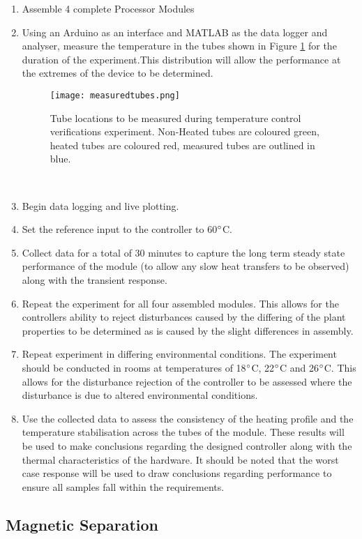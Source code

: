 \begin{enumerate}
	\item Assemble 4 complete Processor Modules
	\item Using an Arduino as an interface and MATLAB as the data logger and analyser, measure the temperature in the tubes shown in Figure \ref{fig:measuredtubes} for the duration of the experiment.This distribution will allow the performance at the extremes of the device to be determined.
	\begin{figure}[!htb]
		\centering
		\texttt{[image: measuredtubes.png]}
		\caption[Temperature Measured Tubes.]{Tube locations to be measured during temperature control verifications experiment. Non-Heated tubes are coloured green, heated tubes are coloured red, measured tubes are outlined in blue.}
		\label{fig:measuredtubes}
	\end{figure} 
	\FloatBarrier
	\item Begin data logging and live plotting.
	\item Set the reference input to the controller to 60$\degree$C.
	\item Collect data for a total of 30 minutes to capture the long term steady state performance of the module (to allow any slow heat transfers to be observed) along with the transient response.
	\item Repeat the experiment for all four assembled modules. This allows for the controllers ability to reject disturbances caused by the differing of the plant properties to be determined as is caused by the slight differences in assembly.
	\item Repeat experiment in differing environmental conditions. The experiment should  be conducted in rooms at temperatures of 18$\degree$C, 22$\degree$C and 26$\degree$C. This allows for the disturbance rejection of the controller to be assessed where the disturbance is due to altered environmental conditions.
	\item Use the collected data to assess the consistency of the heating profile and the temperature stabilisation across the tubes of the module. These results will be used to make conclusions regarding the designed controller along with the thermal characteristics of the hardware. It should be noted that the worst case response will be used to draw conclusions regarding performance to ensure all samples fall within the requirements.
\end{enumerate}

\subsection{Magnetic Separation}

